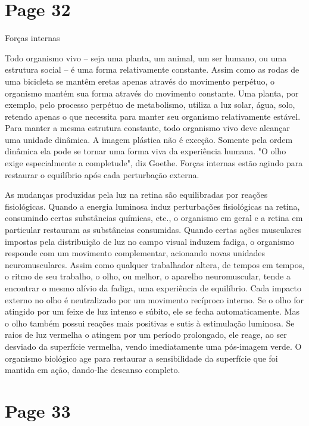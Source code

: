 \documentclass[a4paper]{article}
\begin{document}
\vspace*{\fill}

\newpage
\section*{Page 32}

\centering
Forças internas

Todo organismo vivo -- seja uma planta, um animal, um ser humano, ou uma estrutura social -- é uma forma relativamente constante. Assim como as rodas de uma bicicleta se mantêm eretas apenas através do movimento perpétuo, o organismo mantém sua forma através do movimento constante. Uma planta, por exemplo, pelo processo perpétuo de metabolismo, utiliza a luz solar, água, solo, retendo apenas o que necessita para manter seu organismo relativamente estável. Para manter a mesma estrutura constante, todo organismo vivo deve alcançar uma unidade dinâmica. A imagem plástica não é exceção. Somente pela ordem dinâmica ela pode se tornar uma forma viva da experiência humana. "O olho exige especialmente a completude", diz Goethe. Forças internas estão agindo para restaurar o equilíbrio após cada perturbação externa.

As mudanças produzidas pela luz na retina são equilibradas por reações fisiológicas. Quando a energia luminosa induz perturbações fisiológicas na retina, consumindo certas substâncias químicas, etc., o organismo em geral e a retina em particular restauram as substâncias consumidas. Quando certas ações musculares impostas pela distribuição de luz no campo visual induzem fadiga, o organismo responde com um movimento complementar, acionando novas unidades neuromusculares. Assim como qualquer trabalhador altera, de tempos em tempos, o ritmo de seu trabalho, o olho, ou melhor, o aparelho neuromuscular, tende a encontrar o mesmo alívio da fadiga, uma experiência de equilíbrio. Cada impacto externo no olho é neutralizado por um movimento recíproco interno. Se o olho for atingido por um feixe de luz intenso e súbito, ele se fecha automaticamente. Mas o olho também possui reações mais positivas e sutis à estimulação luminosa. Se raios de luz vermelha o atingem por um período prolongado, ele reage, ao ser desviado da superfície vermelha, vendo imediatamente uma pós-imagem verde. O organismo biológico age para restaurar a sensibilidade da superfície que foi mantida em ação, dando-lhe descanso completo.

\vfill
{}

\newpage
\section*{Page 33}
\end{document}
